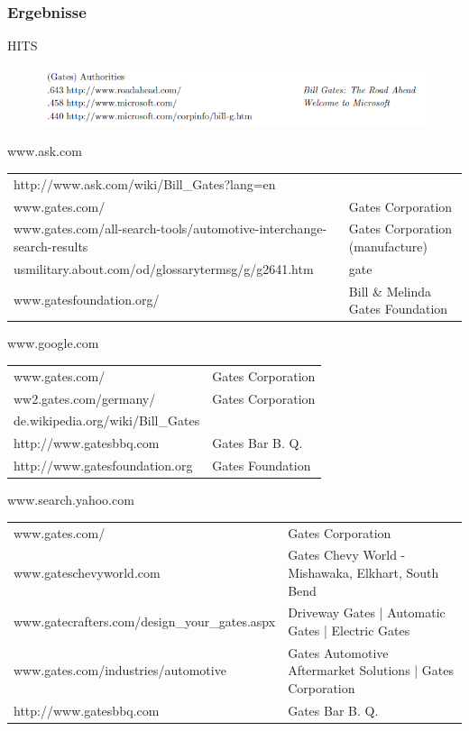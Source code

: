 \documentclass[hyperref={pdfpagelabels=false}]{beamer}
\begin{document}
\begin{frame} [allowframebreaks]
\frametitle{Ergebnisse}
\fontsize{6pt}{7.2}\selectfont

\begin{block}{HITS \cite{Kleinberg}}
	\begin{figure} [th]
		\includegraphics[scale=0.3]{gates.png} 
	\end{figure}
\end{block}
\begin{block}{www.ask.com}
	\begin{tabular}{l l}
		http://www.ask.com/wiki/Bill\_Gates?lang=en & \\
		www.gates.com/ & Gates Corporation \\
		www.gates.com/all-search-tools/automotive-interchange-search-results & Gates Corporation (manufacture)\\
		usmilitary.about.com/od/glossarytermsg/g/g2641.htm & gate \\
		www.gatesfoundation.org/ & Bill \& Melinda Gates Foundation \\
	\end{tabular}
\end{block}
\begin{block}{www.google.com}
	\begin{tabular}{l l}
		www.gates.com/ & Gates Corporation \\
		ww2.gates.com/germany/ & Gates Corporation\\
		de.wikipedia.org/wiki/Bill\_Gates & \\
		http://www.gatesbbq.com	& Gates Bar B. Q. \\
		http://www.gatesfoundation.org & Gates Foundation \\
	\end{tabular}
\end{block}

\begin{block}{www.search.yahoo.com}
	\begin{tabular}{l l}
		www.gates.com/ & Gates Corporation \\
		www.gateschevyworld.com & Gates Chevy World - Mishawaka, Elkhart, South Bend\\
		www.gatecrafters.com/design\_your\_gates.aspx & Driveway Gates | Automatic Gates | Electric Gates \\
		www.gates.com/industries/automotive & Gates Automotive Aftermarket Solutions | Gates Corporation \\
		http://www.gatesbbq.com	& Gates Bar B. Q. \\
	\end{tabular}
\end{block}


\end{frame}
\end{document}
